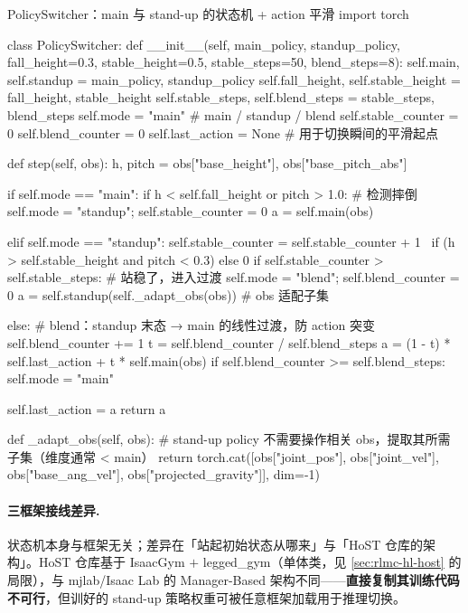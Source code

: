 \begin{codebox}[Python]{PolicySwitcher：main 与 stand-up 的状态机 + action 平滑}
import torch

class PolicySwitcher:
    def __init__(self, main_policy, standup_policy, fall_height=0.3,
                 stable_height=0.5, stable_steps=50, blend_steps=8):
        self.main, self.standup = main_policy, standup_policy
        self.fall_height, self.stable_height = fall_height, stable_height
        self.stable_steps, self.blend_steps = stable_steps, blend_steps
        self.mode = "main"            # main / standup / blend
        self.stable_counter = 0
        self.blend_counter = 0
        self.last_action = None       # 用于切换瞬间的平滑起点

    def step(self, obs):
        h, pitch = obs["base_height"], obs["base_pitch_abs"]

        if self.mode == "main":
            if h < self.fall_height or pitch > 1.0:           # 检测摔倒
                self.mode = "standup"; self.stable_counter = 0
            a = self.main(obs)

        elif self.mode == "standup":
            self.stable_counter = self.stable_counter + 1 \
                if (h > self.stable_height and pitch < 0.3) else 0
            if self.stable_counter > self.stable_steps:        # 站稳了，进入过渡
                self.mode = "blend"; self.blend_counter = 0
            a = self.standup(self._adapt_obs(obs))             # obs 适配子集

        else:  # blend：standup 末态 → main 的线性过渡，防 action 突变
            self.blend_counter += 1
            t = self.blend_counter / self.blend_steps
            a = (1 - t) * self.last_action + t * self.main(obs)
            if self.blend_counter >= self.blend_steps:
                self.mode = "main"

        self.last_action = a
        return a

    def _adapt_obs(self, obs):
        # stand-up policy 不需要操作相关 obs，提取其所需子集（维度通常 < main）
        return torch.cat([obs["joint_pos"], obs["joint_vel"],
                          obs["base_ang_vel"], obs["projected_gravity"]], dim=-1)
\end{codebox}

\paragraph{三框架接线差异.}
状态机本身与框架无关；差异在「站起初始状态从哪来」与「HoST 仓库的架构」。HoST 仓库基于 IsaacGym $+$ legged\_gym（单体类，见 \cref{sec:rlmc-hl-host} 的局限），与 mjlab/Isaac Lab 的 Manager-Based 架构不同——\textbf{直接复制其训练代码不可行}，但训好的 stand-up 策略权重可被任意框架加载用于推理切换。

